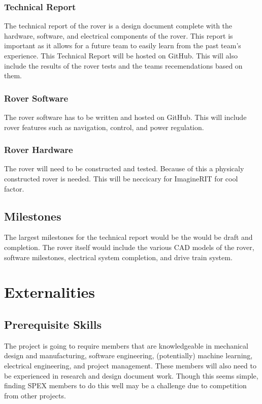 \documentclass[conference]{IEEEtran} %
\begin{document}
\subsubsection{Technical Report}
\label{techreport}

The technical report of the rover is a design document complete with the hardware, software, and electrical components of the rover. This report is important as it allows for a future team to easily learn from the past team's experience. This Technical Report will be hosted on GitHub. This will also include the results of the rover tests and the teams recemendations based on them. 

\subsubsection{Rover Software}
\label{roversoftware}
The rover software has to be written and hosted on GitHub. This will include rover features such as navigation, control, and power regulation. 

\subsubsection{Rover Hardware}
\label{roverhardware}
The rover will need to be constructed and tested. Because of this a physicaly constructed rover is needed. This will be neccicary for ImagineRIT for cool factor. 

\subsection{Milestones}
\label{subsec:milestones}
The largest milestones for the technical report would be the would be draft and completion. 
The rover itself would include the various CAD models of the rover, software milestones, electrical system completion, and drive train system. 

\section{Externalities}
\subsection{Prerequisite Skills}
The project is going to require members that are knowledgeable in mechanical design and manufacturing, software engineering, (potentially) machine learning, electrical engineering, and project management. These members will also need to be experienced in research and design document work. Though this seems simple, finding SPEX members to do this well may be a challenge due to competition from other projects. 
\end{document}
